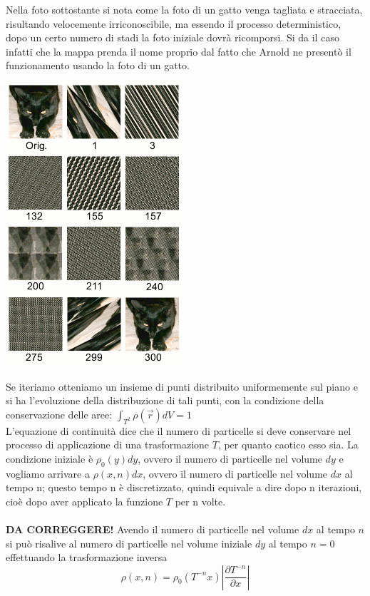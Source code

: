 \documentclass[12pt]{article}
\begin{document}
Nella foto sottostante si nota come la foto di un gatto venga tagliata e stracciata, risultando velocemente irriconoscibile, ma essendo il processo deterministico, dopo un certo numero di stadi la foto iniziale dovrà ricomporsi. Si da il caso infatti che la mappa prenda il nome proprio dal fatto che Arnold ne presentò il funzionamento usando la foto di un gatto.
\begin{center}
\includegraphics[scale=1]{Arnold_cat}
\end{center} 
Se iteriamo otteniamo un insieme di punti distribuito uniformemente sul piano e si ha l'evoluzione della distribuzione di tali punti, con la condizione della conservazione delle aree: $\int_{T^2} \rho(\vec{r}) dV = 1$ \\ 
L'equazione di continuità dice che il numero di particelle si deve conservare nel processo di applicazione di una trasformazione $T$, per quanto caotico esso sia. La condizione iniziale è $\rho_0(y)dy$, ovvero il numero di particelle nel volume $dy$ e vogliamo arrivare a $\rho(x,n)dx$, ovvero il numero di particelle nel volume $dx$ al tempo n; questo tempo n è discretizzato, quindi equivale a dire dopo n iterazioni, cioè dopo aver applicato la funzione $T$ per n volte. \\ \\
\textbf{DA CORREGGERE!}
 Avendo il numero di particelle nel volume $dx$ al tempo $n$ si può risalive al numero di particelle nel volume iniziale $dy$ al tempo $n=0$ effettuando la trasformazione inversa 
$$
	\rho(x,n) = \rho_0(T^{-n}x)\left|\frac{\partial T^{-n}}{\partial x} \right| 
$$ 
\end{document}
